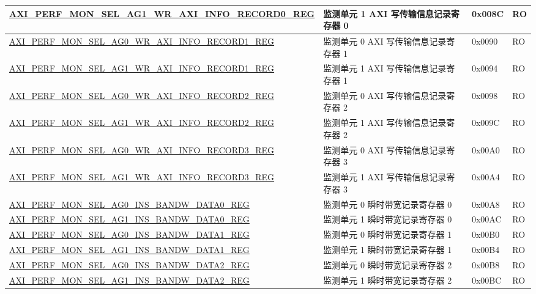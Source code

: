 \begin{longtable}{ | p{9.1cm} | p{5cm} | p{1.3cm} | p{1.3cm} | }
\hyperref[regdesc:AXIPERFMONSELAGNWRAXIINFORECORDMREG]{AXI\_PERF\_MON\_SEL\_AG1\_WR\_AXI\_INFO\_RECORD0\_REG} & 监测单元 1 AXI 写传输信息记录寄存器 0 & 0x008C & RO\\ \hline
\hyperref[regdesc:AXIPERFMONSELAGNWRAXIINFORECORDMREG]{AXI\_PERF\_MON\_SEL\_AG0\_WR\_AXI\_INFO\_RECORD1\_REG} & 监测单元 0 AXI 写传输信息记录寄存器 1 & 0x0090 & RO\\ \hline
\hyperref[regdesc:AXIPERFMONSELAGNWRAXIINFORECORDMREG]{AXI\_PERF\_MON\_SEL\_AG1\_WR\_AXI\_INFO\_RECORD1\_REG} & 监测单元 1 AXI 写传输信息记录寄存器 1 & 0x0094 & RO\\ \hline
\hyperref[regdesc:AXIPERFMONSELAGNWRAXIINFORECORDMREG]{AXI\_PERF\_MON\_SEL\_AG0\_WR\_AXI\_INFO\_RECORD2\_REG} & 监测单元 0 AXI 写传输信息记录寄存器 2 & 0x0098 & RO\\ \hline
\hyperref[regdesc:AXIPERFMONSELAGNWRAXIINFORECORDMREG]{AXI\_PERF\_MON\_SEL\_AG1\_WR\_AXI\_INFO\_RECORD2\_REG} & 监测单元 1 AXI 写传输信息记录寄存器 2 & 0x009C & RO\\ \hline
\hyperref[regdesc:AXIPERFMONSELAGNWRAXIINFORECORDMREG]{AXI\_PERF\_MON\_SEL\_AG0\_WR\_AXI\_INFO\_RECORD3\_REG} & 监测单元 0 AXI 写传输信息记录寄存器 3 & 0x00A0 & RO\\ \hline
\hyperref[regdesc:AXIPERFMONSELAGNWRAXIINFORECORDMREG]{AXI\_PERF\_MON\_SEL\_AG1\_WR\_AXI\_INFO\_RECORD3\_REG} & 监测单元 1 AXI 写传输信息记录寄存器 3 & 0x00A4 & RO\\ \hline
\hyperref[regdesc:AXIPERFMONSELAGNINSBANDWDATAMREG]{AXI\_PERF\_MON\_SEL\_AG0\_INS\_BANDW\_DATA0\_REG} & 监测单元 0 瞬时带宽记录寄存器 0 & 0x00A8 & RO\\ \hline
\hyperref[regdesc:AXIPERFMONSELAGNINSBANDWDATAMREG]{AXI\_PERF\_MON\_SEL\_AG1\_INS\_BANDW\_DATA0\_REG} & 监测单元 1 瞬时带宽记录寄存器 0 & 0x00AC & RO\\ \hline
\hyperref[regdesc:AXIPERFMONSELAGNINSBANDWDATAMREG]{AXI\_PERF\_MON\_SEL\_AG0\_INS\_BANDW\_DATA1\_REG} & 监测单元 0 瞬时带宽记录寄存器 1 & 0x00B0 & RO\\ \hline
\hyperref[regdesc:AXIPERFMONSELAGNINSBANDWDATAMREG]{AXI\_PERF\_MON\_SEL\_AG1\_INS\_BANDW\_DATA1\_REG} & 监测单元 1 瞬时带宽记录寄存器 1 & 0x00B4 & RO\\ \hline
\hyperref[regdesc:AXIPERFMONSELAGNINSBANDWDATAMREG]{AXI\_PERF\_MON\_SEL\_AG0\_INS\_BANDW\_DATA2\_REG} & 监测单元 0 瞬时带宽记录寄存器 2 & 0x00B8 & RO\\ \hline
\hyperref[regdesc:AXIPERFMONSELAGNINSBANDWDATAMREG]{AXI\_PERF\_MON\_SEL\_AG1\_INS\_BANDW\_DATA2\_REG} & 监测单元 1 瞬时带宽记录寄存器 2 & 0x00BC & RO\\ \hline

\end{longtable}
